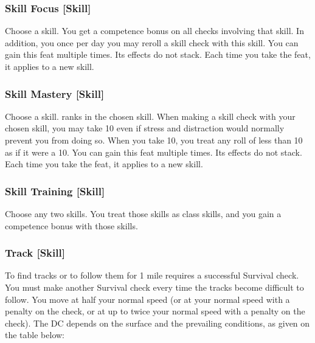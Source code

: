 \subsubsection{Skill Focus [Skill]}
Choose a skill.
 You get a  competence bonus on all checks involving that skill. In addition, you once per day you may reroll a skill check with this skill.
 You can gain this feat multiple times. Its effects do not stack. Each time you take the feat, it applies to a new skill.

\subsubsection{Skill Mastery [Skill]}
Choose a skill.
 ranks in the chosen skill.
\featben When making a skill check with your chosen skill, you may take 10 even if stress and distraction would normally prevent you from doing so. When you take 10, you treat any roll of less than 10 as if it were a 10.
 You can gain this feat multiple times. Its effects do not stack. Each time you take the feat, it applies to a new skill.

\subsubsection{Skill Training [Skill]}
\featben Choose any two skills. You treat those skills as class skills, and you gain a  competence bonus with those skills.

\subsubsection{Track [Skill]}
 To find tracks or to follow them for 1 mile requires a successful Survival check. You must make another Survival check every time the tracks become difficult to follow.
You move at half your normal speed (or at your normal speed with a  penalty on the check, or at up to twice your normal speed with a  penalty on the check). The DC depends on the surface and the prevailing conditions, as given on the table below:

